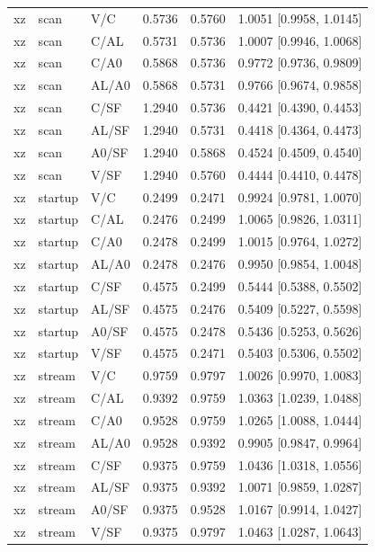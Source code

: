 \begin{longtable}{lllrrl}
xz & scan & V/C & 0.5736 & 0.5760 & 1.0051 [0.9958, 1.0145] \\
xz & scan & C/AL & 0.5731 & 0.5736 & 1.0007 [0.9946, 1.0068] \\
xz & scan & C/A0 & 0.5868 & 0.5736 & 0.9772 [0.9736, 0.9809] \\
xz & scan & AL/A0 & 0.5868 & 0.5731 & 0.9766 [0.9674, 0.9858] \\
xz & scan & C/SF & 1.2940 & 0.5736 & 0.4421 [0.4390, 0.4453] \\
xz & scan & AL/SF & 1.2940 & 0.5731 & 0.4418 [0.4364, 0.4473] \\
xz & scan & A0/SF & 1.2940 & 0.5868 & 0.4524 [0.4509, 0.4540] \\
xz & scan & V/SF & 1.2940 & 0.5760 & 0.4444 [0.4410, 0.4478] \\
xz & startup & V/C & 0.2499 & 0.2471 & 0.9924 [0.9781, 1.0070] \\
xz & startup & C/AL & 0.2476 & 0.2499 & 1.0065 [0.9826, 1.0311] \\
xz & startup & C/A0 & 0.2478 & 0.2499 & 1.0015 [0.9764, 1.0272] \\
xz & startup & AL/A0 & 0.2478 & 0.2476 & 0.9950 [0.9854, 1.0048] \\
xz & startup & C/SF & 0.4575 & 0.2499 & 0.5444 [0.5388, 0.5502] \\
xz & startup & AL/SF & 0.4575 & 0.2476 & 0.5409 [0.5227, 0.5598] \\
xz & startup & A0/SF & 0.4575 & 0.2478 & 0.5436 [0.5253, 0.5626] \\
xz & startup & V/SF & 0.4575 & 0.2471 & 0.5403 [0.5306, 0.5502] \\
xz & stream & V/C & 0.9759 & 0.9797 & 1.0026 [0.9970, 1.0083] \\
xz & stream & C/AL & 0.9392 & 0.9759 & 1.0363 [1.0239, 1.0488] \\
xz & stream & C/A0 & 0.9528 & 0.9759 & 1.0265 [1.0088, 1.0444] \\
xz & stream & AL/A0 & 0.9528 & 0.9392 & 0.9905 [0.9847, 0.9964] \\
xz & stream & C/SF & 0.9375 & 0.9759 & 1.0436 [1.0318, 1.0556] \\
xz & stream & AL/SF & 0.9375 & 0.9392 & 1.0071 [0.9859, 1.0287] \\
xz & stream & A0/SF & 0.9375 & 0.9528 & 1.0167 [0.9914, 1.0427] \\
xz & stream & V/SF & 0.9375 & 0.9797 & 1.0463 [1.0287, 1.0643] \\
\bottomrule\end{longtable}
